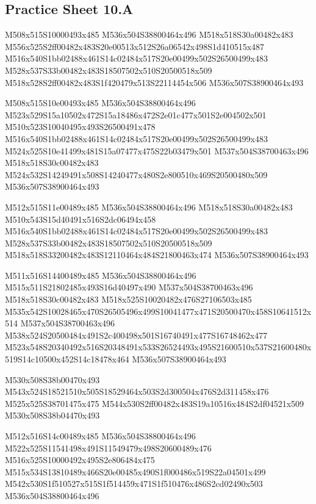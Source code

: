 \documentclass{article}
\begin{document}
\subsection{Practice Sheet 10.A}

\begin{multicols}{5}
\begin{center}

M508x515S10000493x485 %
M536x504S38800464x496 %
M518x518S30a00482x483 %
M556x525S2ff00482x483S20e00513x512S26a06542x498S1d410515x487 %
M516x540S1bb02488x461S14c02484x517S20e00499x502S26500499x483 %
M528x537S33b00482x483S18507502x510S20500518x509 %
M518x528S2ff00482x483S1f420479x513S22114454x506 %
M536x507S38900464x493 %
\vfil
\columnbreak

M508x515S10e00493x485 %
M536x504S38800464x496 %
M523x529S15a10502x472S15a18486x472S2e01c477x501S2e004502x501 %
M510x523S10040495x493S26500491x478 %
M516x540S1bb02488x461S14c02484x517S20e00499x502S26500499x483 %
M524x525S10e41499x481S15a07477x475S22b03479x501 %
M537x504S38700463x496 %
M518x518S30c00482x483 %
M524x532S14249491x508S14240477x480S2e800510x469S20500480x509 %
M536x507S38900464x493 %
\vfil
\columnbreak

M512x515S11e00489x485 %
M536x504S38800464x496 %
M518x518S30a00482x483 %
M510x543S15d40491x516S2dc06494x458 %
M516x540S1bb02488x461S14c02484x517S20e00499x502S26500499x483 %
M528x537S33b00482x483S18507502x510S20500518x509 %
M518x518S33200482x483S12110464x484S21800463x474 %
M536x507S38900464x493 %
\vfil
\columnbreak

M511x516S14400489x485 %
M536x504S38800464x496 %
M515x511S21802485x493S16d40497x490 %
M537x504S38700463x496 %
M518x518S30c00482x483 %
M518x525S10020482x476S27106503x485 %
M535x542S10028465x470S26505496x499S10041477x471S20500470x458S10641512x514 %
M537x504S38700463x496 %
M538x524S20500484x491S2c400498x501S16740491x477S16748462x477 %
M523x548S20340492x516S20348491x533S26524493x495S21600510x537S21600480x519S14c10500x452S14c18478x464 %
M536x507S38900464x493 %

M530x508S38b00470x493 %
M543x524S18521510x505S18529464x503S2d300504x476S2d311458x476 %
M525x525S38701475x475 %
M544x530S2ff00482x483S19a10516x484S2df04521x509 %
M530x508S38b04470x493 %
\vfil
\columnbreak

M512x516S14c00489x485 %
M536x504S38800464x496 %
M522x525S11541498x491S11549479x498S20600489x476 %
M516x525S10000492x495S2e806484x475 %
M515x534S13810489x466S20e00485x490S1f000486x519S22a04501x499 %
M542x530S1f510527x515S1f514459x471S1f510476x486S2cd02490x503 %
M536x504S38800464x496 %


\end{center}
\end{multicols}
\end{document}

